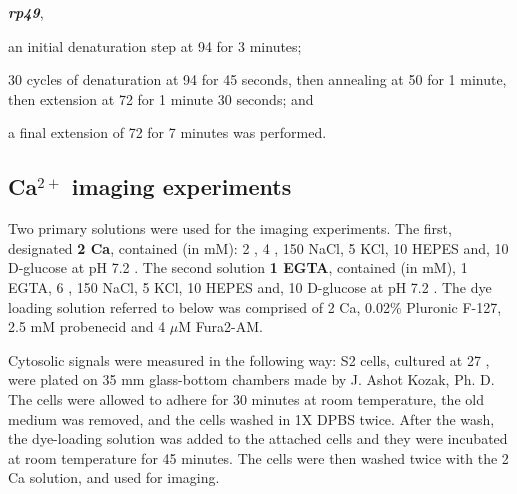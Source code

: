 \textbf{\itshape rp49}, 
\begin{inparaenum}[(i)]
\item an initial denaturation step at 94 \textcelsius{} for 3 minutes;
\item 30 cycles of denaturation at 94 \textcelsius{} for 45 seconds, then annealing at 50 \textcelsius{} for 1 minute, then extension at 72 \textcelsius{} for 1 minute 30 seconds; and
\item a final extension of 72 \textcelsius{} for 7 minutes was performed. 
\end{inparaenum}




\subsection{Ca$^{2+}$ imaging experiments}
Two primary solutions were used for the \Ca{} imaging experiments. The first, designated \textbf{2 Ca}, contained (in mM): 2 \CaCl, 4 \MgCl, 150 NaCl, 5 KCl, 10 HEPES and, 10 D-glucose at pH 7.2 \citep{Zhang2005}. The second solution \textbf{1 EGTA}, contained (in mM), 1 EGTA, 6 \MgCl, 150 NaCl, 5 KCl, 10 HEPES and, 10 D-glucose at pH 7.2 \citep{Zhang2005}. The dye loading solution referred to below was comprised of 2 Ca, 0.02\% Pluronic F-127, 2.5 mM probenecid and 4 $\mu$M Fura2-AM. %


Cytosolic \Ca{} signals were measured in the following way: S2 cells, cultured at 27 \textcelsius{}, were plated on 35 mm glass-bottom chambers made by J. Ashot Kozak, Ph. D. The cells were allowed to adhere for 30 minutes at room temperature, the old medium was removed, and the cells washed in 1X DPBS twice. After the wash, the dye-loading solution was added to the attached cells and they were incubated at room temperature for 45 minutes. The cells were then washed twice with the 2 Ca solution, and used for imaging. 

